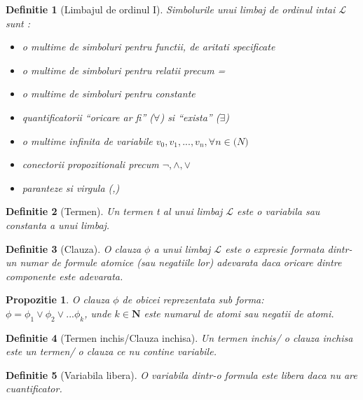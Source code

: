 \documentclass{article}
\newtheorem{definition}{Definitie}[section]
\newtheorem{prop}{Propozitie}[section]
\begin{document}
\begin{definition}[Limbajul de ordinul I]
Simbolurile unui limbaj de ordinul intai $\mathcal{L}$ sunt \cite{FOL}:\\
\begin{itemize} 
	\item o multime de simboluri pentru functii, de aritati specificate
	\item o multime de simboluri pentru relatii precum =
	\item o multime de simboluri pentru constante
	\item quantificatorii ``oricare ar fi'' ($\forall$) si ``exista'' ($\exists$)
	\item o multime infinita de variabile $v_0, v_1, ..., v_n, \forall n \in \mathbf(N)$
	\item conectorii propozitionali precum $\neg, \land, \lor$
	\item paranteze si virgula (,)
\end{itemize}
\end{definition}

\begin{definition}[Termen]
Un termen t al unui limbaj $\mathcal{L}$ este o variabila sau constanta a unui limbaj. \cite{FOL}
\end{definition}

\begin{definition}[Clauza]
O clauza $\phi$ a unui limbaj $\mathcal{L}$ este o expresie formata dintr-un numar de formule atomice (sau negatiile lor) adevarata daca oricare dintre componente este adevarata. \cite{Clause}
\end{definition}

\begin{prop}
O clauza $\phi$ de obicei reprezentata sub forma:\\
	$\phi = \phi_1 \vee \phi_2 \vee ... \phi_k$, unde $k \in \mathbf{N}$ este numarul de atomi sau negatii de atomi. \cite{Clause}
\end{prop}

\begin{definition}[Termen inchis/Clauza inchisa]
Un termen inchis/ o clauza inchisa este un termen/ o clauza ce nu contine variabile. \cite{Closed_Term}
\end{definition}

\begin{definition}[Variabila libera]
O variabila dintr-o formula este libera daca nu are cuantificator. \cite{Free_Variable}
\end{definition}
\end{document}
